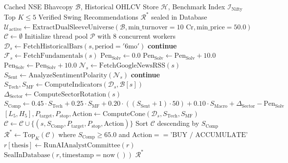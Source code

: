 \documentclass[11pt,a4paper]{article}
\begin{document}
\begin{algorithm}[H]
\caption{Daily Recommendation Generation \& Multi-Factor Ranking}
\begin{algorithmic}[1]
\Require Cached NSE Bhavcopy $\mathcal{B}$, Historical OHLCV Store $\mathcal{H}$, Benchmark Index $\mathcal{I}_{\text{Nifty}}$
\Ensure Top $K \le 5$ Verified Swing Recommendations $\mathcal{R}^*$ sealed in Database
\State $\mathcal{U}_{\text{active}} \gets \text{ExtractDualSleeveUniverse}(\mathcal{B}, \text{min\_turnover}=10\text{ Cr}, \text{min\_price}=50.0)$
\State $\mathcal{C} \gets \emptyset$ 
\State Initialize thread pool $\mathcal{P}$ with 8 concurrent workers
    \State $\mathcal{D}_s \gets \text{FetchHistoricalBars}(s, \text{period}='6\text{mo}')$
        \State \textbf{continue}
    \EndIf
    \State $\mathcal{F}_s \gets \text{FetchFundamentals}(s)$
    \State $\text{Pen}_{\text{Solv}} \gets 0.0$
     $\text{Pen}_{\text{Solv}} \gets \text{Pen}_{\text{Solv}} + 10.0$ \EndIf
     $\text{Pen}_{\text{Solv}} \gets \text{Pen}_{\text{Solv}} + 10.0$ \EndIf
    \State $\mathcal{N}_s \gets \text{FetchGoogleNewsRSS}(s)$
    \State $S_{\text{Sent}} \gets \text{AnalyzeSentimentPolarity}(\mathcal{N}_s)$
        \State \textbf{continue} 
    \EndIf
    \State $S_{\text{Tech}}, S_{\text{MF}} \gets \text{ComputeIndicators}(\mathcal{D}_s, \mathcal{B}[s])$
    \State $\Delta_{\text{Sector}} \gets \text{ComputeSectorRotation}(s)$
    \State $S_{\text{Comp}} \gets 0.45 \cdot S_{\text{Tech}} + 0.25 \cdot S_{\text{MF}} + 0.20 \cdot ((S_{\text{Sent}} + 1) \cdot 50) + 0.10 \cdot S_{\text{Macro}} + \Delta_{\text{Sector}} - \text{Pen}_{\text{Solv}}$
    \State $[L_5, H_5], P_{\text{target}}, P_{\text{stop}}, \text{Action} \gets \text{ComputeCone}(\mathcal{D}_s, S_{\text{Tech}}, S_{\text{MF}})$
    \State $\mathcal{C} \gets \mathcal{C} \cup \{(s, S_{\text{Comp}}, P_{\text{target}}, P_{\text{stop}}, \text{Action})\}$
\EndFor
\State Sort $\mathcal{C}$ descending by $S_{\text{Comp}}$
\State $\mathcal{R}^* \gets \text{Top}_K(\mathcal{C})$ where $S_{\text{Comp}} \ge 65.0$ and $\text{Action} == \text{'BUY / ACCUMULATE'}$
    \State $r[\text{thesis}] \gets \text{RunAIAnalystCommittee}(r)$
    \State $\text{SealInDatabase}(r, \text{timestamp}=\text{now}())$
\EndFor
\State \Return $\mathcal{R}^*$
\end{algorithmic}
\end{algorithm}
\end{document}
